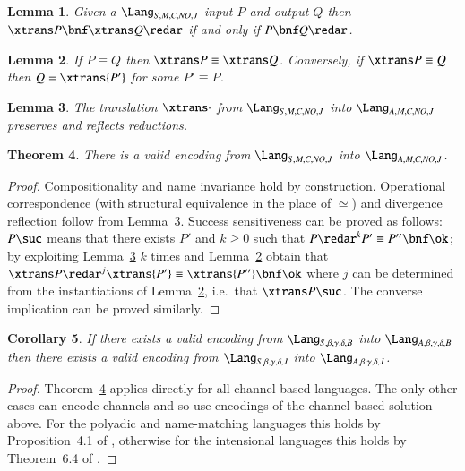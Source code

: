 \documentclass[submission,copyright,creativecommons]{eptcs}
\newtheorem{theorem}{Theorem}[section]
\newtheorem{lemma}[theorem]{Lemma}
\newtheorem{corollary}[theorem]{Corollary}
\renewcommand{\beq}{\simeq}
\begin{document}
\begin{lemma}
\label{lem:minussynch-match}
Given a $\Lang_{S,M,C,\mathit{NO},J}$ input $P$
and output $Q$
then $\xtrans P \bnf \xtrans Q \redar$ if and only if $P\bnf Q \redar$.
\end{lemma}

\begin{lemma}
\label{lem:minussynch-equiv}
If $P\equiv Q$ then $\xtrans P \equiv \xtrans Q$.
Conversely, if $\xtrans P \equiv Q$ then $Q=\xtrans {P'}$ for some $P'\equiv P$.
\end{lemma}

\begin{lemma}
\label{lem:minussynch-red}
The translation $\xtrans\cdot$ from $\Lang_{S,M,C,\mathit{NO},J}$ into $\Lang_{A,M,C,\mathit{NO},J}$ preserves
and reflects reductions.
\end{lemma}

\begin{theorem}
\label{thm:synch}
There is a valid encoding from $\Lang_{S,M,C,\mathit{NO},J}$ into $\Lang_{A,M,C,\mathit{NO},J}$.
\end{theorem}
\begin{proof}
Compositionality and name invariance hold by construction.
Operational correspondence (with structural equivalence in the place of $\beq$)
and divergence reflection follow from Lemma~\ref{lem:minussynch-red}.
Success sensitiveness can be proved as follows: $P\suc$ means that there exists $P'$ and
$k\geq 0$ such that $P\redar^k P'\equiv P''\bnf \ok$; by exploiting Lemma~\ref{lem:minussynch-red}
$k$ times and Lemma~\ref{lem:minussynch-equiv} obtain that
$\xtrans P \redar^j \xtrans {P'}\equiv \xtrans {P''}\bnf \ok$ where $j$ can be determined from the
instantiations of Lemma~\ref{lem:minussynch-equiv},
i.e.~that $\xtrans P \suc$.
The converse implication can be proved similarly.
\end{proof}

\begin{corollary}
If there exists a valid encoding from $\Lang_{S,\beta,\gamma,\delta,B}$ into $\Lang_{A,\beta,\gamma,\delta,B}$
then there exists a valid encoding from $\Lang_{S,\beta,\gamma,\delta,J}$ into $\Lang_{A,\beta,\gamma,\delta,J}$.
\end{corollary}
\begin{proof}
Theorem~\ref{thm:synch} applies directly for all channel-based languages.
The only other cases can encode channels and so use encodings of the channel-based solution above.
For the polyadic and name-matching languages this holds by Proposition~4.1 of \cite{G:IC08},
otherwise for the intensional languages this holds by Theorem~6.4 of \cite{givenwilson:hal-01026301}.
\end{proof}
\end{document}
